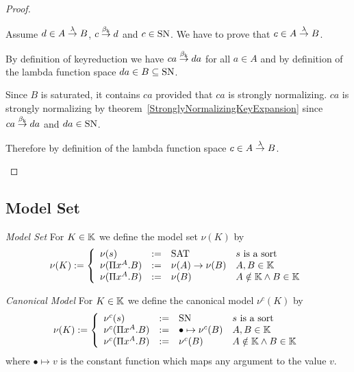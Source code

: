 \begin{theorem}
\begin{proof}
\begin{enumerate}
            Assume $d \in A \stackrel{\lambda}{\to} B$, $c \stackrel{\beta_{\text{k}}}{\to} d$ and $c \in \text{SN}$. We
            have to prove that $c \in A \stackrel{\lambda}{\to} B$.

            By definition of keyreduction we have $ca \stackrel{\beta_{\text{k}}}{\to} da$ for all $a
            \in A$ and by definition of the lambda function space $da \in
            B \subseteq \text{SN}$.

            Since $B$ is saturated, it contains $ca$ provided that $ca$ is
            strongly normalizing. $ca$ is strongly normalizing by
            theorem~\ref{StronglyNormalizingKeyExpansion} since $ca \stackrel{\beta_{\text{k}}}{\to}
            da$ and $da \in \text{SN}$.

            Therefore by definition of
            the lambda function space $c \in A \stackrel{\lambda}{\to} B$.
        \end{enumerate}
    \end{proof}
\end{theorem}




\subsection{Model Set}

\begin{definition}
    \emph{Model Set} For $K \in \mathbb{K}$ we define the model set
    $\nu(K)$ by
    $$
        \nu(K) :=
        \left \{
        \begin{array}{llll}
            \nu(s) &:=& \text{SAT} & s \text{ is a sort}
            \\
            \nu(\Pi x^A. B) &:=& \nu(A)\to \nu(B) & A,B \in \mathbb{K}
            \\
            \nu(\Pi x^A. B) &:=& \nu(B) & A \notin \mathbb{K} \land B \in \mathbb{K}
        \end{array}
        \right.
    $$
\end{definition}



\begin{definition}
    \emph{Canonical Model} For $K \in \mathbb{K}$ we define the
    canonical model $\nu^c(K)$ by
    $$
        \nu(K) :=
        \left \{
        \begin{array}{llll}
            \nu^c(s) &:=& \text{SN} & s \text{ is a sort}
            \\
            \nu^c(\Pi x^A. B)
            &:=&
            \bullet \mapsto \nu^c(B) & A,B \in \mathbb{K}
            \\
            \nu^c(\Pi x^A. B)
            &:=&
            \nu^c(B) & A \notin \mathbb{K} \land B \in \mathbb{K}
        \end{array}
        \right.
    $$
    where $\bullet \mapsto v$ is the constant function which maps any argument
    to the value $v$.
\end{definition}


